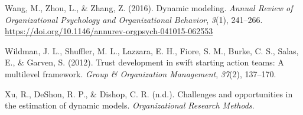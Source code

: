 \documentclass[english,,man]{apa6}
\begin{document}
\leavevmode\hypertarget{ref-Wang2016}{}%
Wang, M., Zhou, L., \& Zhang, Z. (2016). Dynamic modeling. \emph{Annual Review of Organizational Psychology and Organizational Behavior}, \emph{3}(1), 241--266. \url{https://doi.org/10.1146/annurev-orgpsych-041015-062553}

\leavevmode\hypertarget{ref-wildman2012trust}{}%
Wildman, J. L., Shuffler, M. L., Lazzara, E. H., Fiore, S. M., Burke, C. S., Salas, E., \& Garven, S. (2012). Trust development in swift starting action teams: A multilevel framework. \emph{Group \& Organization Management}, \emph{37}(2), 137--170.

\leavevmode\hypertarget{ref-xu_deshon_dishop}{}%
Xu, R., DeShon, R. P., \& Dishop, C. R. (n.d.). Challenges and opportunities in the estimation of dynamic models. \emph{Organizational Research Methods}.
\end{document}
